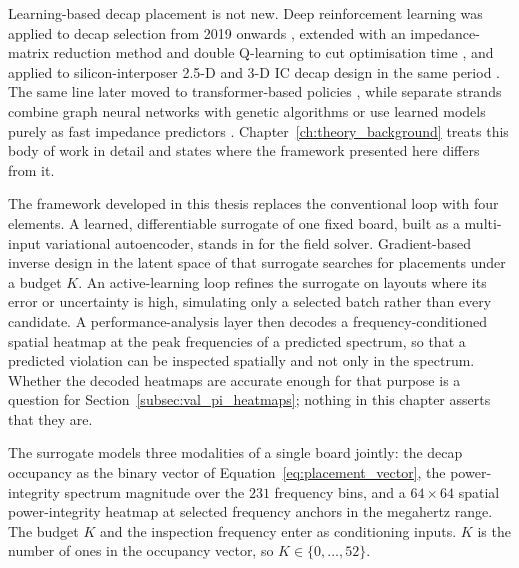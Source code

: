 Learning-based decap placement is not new. Deep reinforcement learning was applied to decap
selection from 2019 onwards \cite{zhang2019decoupling}, extended with an impedance-matrix
reduction method and double Q-learning to cut optimisation time \cite{zhang2020enhanced}, and
applied to silicon-interposer 2.5-D and 3-D IC decap design in the same period
\cite{park2020drldecap}. The same line later moved to transformer-based policies
\cite{park2022transformer,kim2023devformer}, while separate strands combine graph neural networks
with genetic algorithms \cite{convga2024gcn} or use learned models purely as fast impedance
predictors \cite{zhang2021fast}. Chapter~\ref{ch:theory_background} treats this body of work in
detail and states where the framework presented here differs from it.

The framework developed in this thesis replaces the conventional loop with four elements. A
learned, differentiable surrogate of one fixed board, built as a multi-input variational
autoencoder, stands in for the field solver. Gradient-based inverse design in the latent space of
that surrogate searches for placements under a budget $K$. An active-learning loop refines the
surrogate on layouts where its error or uncertainty is high, simulating only a selected batch
rather than every candidate. A performance-analysis layer then decodes a frequency-conditioned
spatial heatmap at the peak frequencies of a predicted spectrum, so that a predicted violation can
be inspected spatially and not only in the spectrum. Whether the decoded heatmaps are accurate
enough for that purpose is a question for Section~\ref{subsec:val_pi_heatmaps}; nothing in this
chapter asserts that they are.

The surrogate models three modalities of a single board jointly: the decap occupancy as the binary
vector of Equation~\eqref{eq:placement_vector}, the power-integrity spectrum magnitude over the
$231$ frequency bins, and a $64 \times 64$ spatial power-integrity heatmap at selected frequency
anchors in the megahertz range. The budget $K$ and the inspection frequency enter as conditioning
inputs. $K$ is the number of ones in the occupancy vector, so $K \in \{0,\dots,52\}$.

